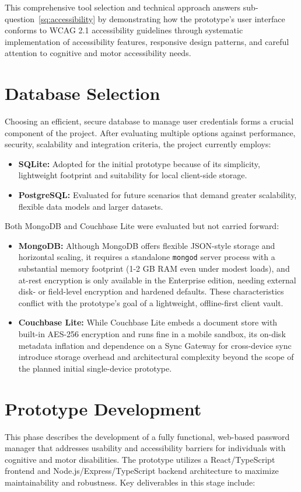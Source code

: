This comprehensive tool selection and technical approach answers sub-question~\ref{sq:accessibility} by demonstrating how the prototype's user interface conforms to WCAG 2.1 accessibility guidelines through systematic implementation of accessibility features, responsive design patterns, and careful attention to cognitive and motor accessibility needs.

\section{Database Selection}
\label{sec:database-selection}
Choosing an efficient, secure database to manage user credentials forms a crucial component of the project. After evaluating multiple options against performance, security, scalability and integration criteria, the project currently employs:

\begin{itemize}
  \item \textbf{SQLite:} Adopted for the initial prototype because of its simplicity, lightweight footprint and suitability for local client-side storage.
  \item \textbf{PostgreSQL:} Evaluated for future scenarios that demand greater scalability, flexible data models and larger datasets.
\end{itemize}

Both MongoDB and Couchbase Lite were evaluated but not carried forward:

\begin{itemize}
  \item \textbf{MongoDB:} Although MongoDB offers flexible JSON-style storage and horizontal scaling, it requires a standalone \texttt{mongod} server process with a substantial memory footprint (1-2 GB RAM even under modest loads), and at-rest encryption is only available in the Enterprise edition, needing external disk- or field-level encryption and hardened defaults. These characteristics conflict with the prototype's goal of a lightweight, offline-first client vault.
  \item \textbf{Couchbase Lite:} While Couchbase Lite embeds a document store with built-in AES-256 encryption and runs fine in a mobile sandbox, its on-disk metadata inflation and dependence on a Sync Gateway for cross-device sync introduce storage overhead and architectural complexity beyond the scope of the planned initial single-device prototype.
\end{itemize}

\section{Prototype Development}
This phase describes the development of a fully functional, web-based password manager that addresses usability and accessibility barriers for individuals with cognitive and motor disabilities. The prototype utilizes a React/TypeScript frontend and Node.js/Express/TypeScript backend architecture to maximize maintainability and robustness. Key deliverables in this stage include:

